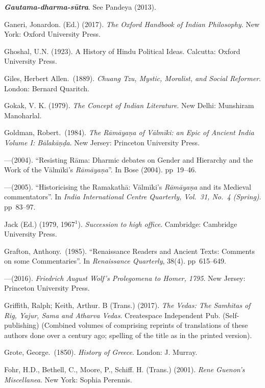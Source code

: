 \begin{thebibliography}{99}
{\sl\bfseries Gautama-dharma-sūtra}. See Pandeya (2013). 

Ganeri, Jonardon. (Ed.) (2017). {\sl The Oxford Handbook of Indian Philosophy}. New York: Oxford University Press. 

Ghoshal, U.N. (1923). A History of Hindu Political Ideas. Calcutta: Oxford University Press. 

Giles, Herbert Allen.\ (1889). {\sl Chuang Tzu, Mystic, Moralist, and Social Reformer}. London: Bernard Quaritch. 

Gokak, V. K.  (1979). {\sl The Concept of Indian Literature}. New Delhi: Munshiram Manoharlal. 

Goldman, Robert.\ (1984). {\sl The Rāmāyaṇa of Vālmīki: an Epic of Ancient India Volume I: Bālakāṇḍa}. New Jersey: Princeton University Press. 

---\kern3pt(2004). “Resisting Rāma: Dharmic debates on Gender and Hierarchy and the Work of the Vālmīki’s {\sl Rāmāyaṇa}”. In Bose (2004). pp~19--46. 

---\kern3pt(2005). “Historicising the Ramakathā: Vālmīki's {\sl Rāmāyaṇa} and its Medieval commentators”. In {\sl India International Centre Quarterly, Vol.~31, No.~4 (Spring)}. pp~83--97.

Jack (Ed.) (1979, 1967$^{1}$). {\sl Succession to high office}. Cambridge: Cambridge University Press. 

Grafton, Anthony.\ (1985). “Renaissance Readers and Ancient Texts: Comments on some Commentaries”. In {\sl Renaissance Quarterly}, 38(4). pp~615--649.

---\kern3pt(2016). {\sl Friedrich August Wolf’s Prolegomena to Homer, 1795}.  New Jersey: Princeton University Press. 

Griffith, Ralph; Keith, Arthur. B (Trans.) (2017). {\sl The Vedas: The Samhitas of Rig, Yajur, Sama and Atharva Vedas}. Createspace Independent Pub. (Self-publishing) (Combined volumes of comprising reprints of translations of these authors done over a century ago; spelling of the title as in the printed version).

Grote, George.\ (1850). {\sl History of Greece}.  London: J. Murray. 

Fohr, H.D., Bethell, C., Moore, P., Schiff. H. (Trans.) (2001). {\sl Rene Guenon’s Miscellanea}. New York: Sophia Perennis. 


\end{thebibliography}

